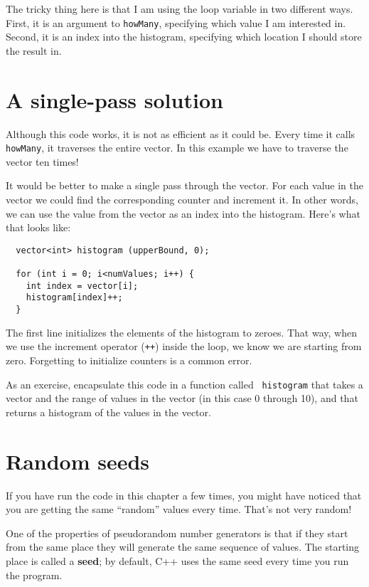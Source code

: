 The tricky thing here is that I am using the loop variable
in two different ways.  First, it is an argument to {\tt howMany},
specifying which value I am interested in.  Second, it is
an index into the histogram, specifying which location I should
store the result in.

\section{A single-pass solution}

Although this code works, it is not as efficient as it could
be.  Every time it calls {\tt howMany}, it traverses the
entire vector.  In this example we have to traverse the
vector ten times!

It would be better to make a single pass through the vector.
For each value in the vector we could find the corresponding
counter and increment it.  In other words, we can use the
value from the vector as an index into the histogram.  Here's
what that looks like:

\begin{verbatim}
  vector<int> histogram (upperBound, 0);

  for (int i = 0; i<numValues; i++) {
    int index = vector[i];
    histogram[index]++;
  }
\end{verbatim}
%
The first line initializes the elements of the histogram to
zeroes.  That way, when we use the increment
operator ({\tt ++}) inside the loop, we know we are starting from zero.
Forgetting to initialize counters is a common error.

As an exercise, encapsulate this code in a function called {\tt
histogram} that takes a vector and the range of values in the vector
(in this case 0 through 10), and that returns a histogram of the
values in the vector.

\section{Random seeds}

If you have run the code in this chapter a few times, you might
have noticed that you are getting the same ``random'' values
every time.  That's not very random!

One of the properties of pseudorandom number generators is that
if they start from the same place they will generate
the same sequence of values.  The starting place is called
a {\bf seed}; by default, C++ uses
the same seed every time you run the program.

